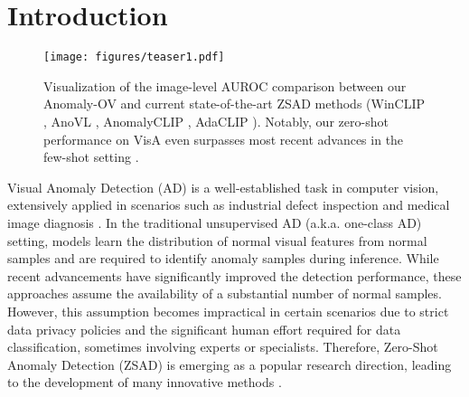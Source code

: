 \section{Introduction}
\begin{figure}[t]
\centering
    \texttt{[image: figures/teaser1.pdf]}
\caption{Visualization of the image-level AUROC comparison between our Anomaly-OV and current state-of-the-art ZSAD methods (WinCLIP \cite{jeong2023winclip}, AnoVL \cite{deng2023anovl}, AnomalyCLIP \cite{zhou2024anomalyclip}, AdaCLIP \cite{cao2025adaclip}). Notably, our zero-shot performance on VisA even surpasses most recent advances in the few-shot setting \cite{li2024promptad, zhu2024toward, gu2024anomalygpt}.}
\label{fig:teaser}
 \vspace{-1mm}
\end{figure}

Visual Anomaly Detection (AD) is a well-established task in computer vision, extensively applied in scenarios such as industrial defect inspection \cite{mvtec, xie2023pushing, roth2022towards, huang2022registration, mou2023rgi, chen2022deep, bergmann2020uninformed, reiss2023mean, you2022a, cao2023anomaly} and medical image diagnosis \cite{wolleb2022diffusion, bmad, han2021madgan, huang2024adapting, zhang2024mediclip, wei2018anomaly, fernando2021deep, zhao2021anomaly}. In the traditional unsupervised AD (a.k.a. one-class AD) setting,  models learn the distribution of normal visual features from normal samples and are required to identify anomaly samples during inference. While recent advancements \cite{isaac2024towards, strater2024generalad, chen2024unified, tang2025incremental, he2024learning, yao2024glad, zhang2024realnet, lee2024text, yao2024hierarchical, ho2024long, fuvcka2025transfusion, hou2021divide} have significantly improved the detection performance, these approaches assume the availability of a substantial number of normal samples. However, this assumption becomes impractical in certain scenarios due to strict data privacy policies and the significant human effort required for data classification, sometimes involving experts or specialists. Therefore, Zero-Shot Anomaly Detection (ZSAD) is emerging as a popular research direction, leading to the development of many innovative methods \cite{jeong2023winclip, zhou2024anomalyclip, cao2025adaclip, li2024zero, li2024promptad2, gu2024filo, sato2023prompt, deng2024simclip, schwartz2024maeday, zhu2024llms}. 

